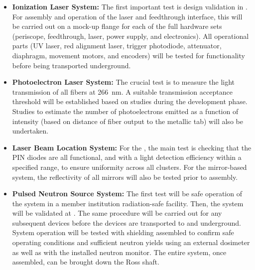 \begin{itemize}
    \item {\bf Ionization Laser System:} The first %
    important test is  design validation in . For assembly and operation of the laser and feedthrough interface, this will be carried out on a mock-up flange for each of the full hardware sets (periscope, feedthrough, laser, power supply, and electronics). All operational parts (UV laser, red alignment laser, trigger photodiode, attenuator, diaphragm, movement motors, and encoders) will be tested for functionality before being transported underground.
    \item {\bf Photoelectron Laser System:} The crucial test is to measure the light transmission of all fibers at \SI{266}{\nano\m}. A suitable transmission acceptance threshold will be established based on studies during the development phase. Studies to estimate the number of photoelectrons emitted as a function of intensity (based on distance of fiber output to the metallic tab) will also be undertaken.
    \item {\bf Laser Beam Location System:} For the , the main test is checking that the PIN diodes are all functional, and with a light detection efficiency within a specified range, to ensure uniformity across all clusters. For the mirror-based system, the reflectivity of all mirrors will also be tested prior to assembly.
    \item {\bf Pulsed Neutron Source System:} The first test will be safe operation of the system in a member institution radiation-safe facility. Then, the system will be validated at . The same procedure %
    will be carried out for any subsequent devices before the devices are transported to  and underground. System operation will be tested with shielding assembled to confirm safe operating conditions and sufficient neutron yields using an external dosimeter as well as with the installed neutron monitor. The entire system, once assembled, can be brought down the Ross shaft.
\end{itemize}
